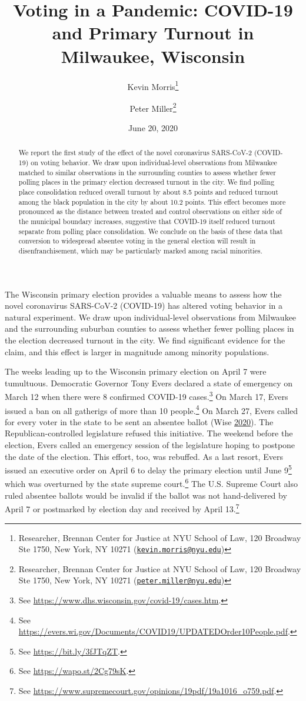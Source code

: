 \documentclass[
  12pt,
]{article}
\title{Voting in a Pandemic: COVID-19 and Primary Turnout in Milwaukee, Wisconsin}
\author{Kevin Morris\footnote{Researcher, Brennan Center for Justice at NYU School of Law, 120 Broadway Ste 1750, New York, NY 10271 (\href{mailto:kevin.morris@nyu.edu}{\nolinkurl{kevin.morris@nyu.edu}})} \and Peter Miller\footnote{Researcher, Brennan Center for Justice at NYU School of Law, 120 Broadway Ste 1750, New York, NY 10271 (\href{mailto:peter.miller@nyu.edu}{\nolinkurl{peter.miller@nyu.edu}})}}
\date{June 20, 2020}
\begin{document}
\maketitle
\begin{abstract}
We report the first study of the effect of the novel coronavirus SARS-CoV-2 (COVID-19) on voting behavior. We draw upon individual-level observations from Milwaukee matched to similar observations in the surrounding counties to assess whether fewer polling places in the primary election decreased turnout in the city. We find polling place consolidation reduced overall turnout by about 8.5 points and reduced turnout among the black population in the city by about 10.2 points. This effect becomes more pronounced as the distance between treated and control observations on either side of the municipal boundary increases, suggestive that COVID-19 itself reduced turnout separate from polling place consolidation. We conclude on the basis of these data that conversion to widespread absentee voting in the general election will result in disenfranchisement, which may be particularly marked among racial minorities.
\end{abstract}

\pagebreak

\doublespacing

The Wisconsin primary election provides a valuable means to assess how the novel coronavirus SARS-CoV-2 (COVID-19) has altered voting behavior in a natural experiment. We draw upon individual-level observations from Milwaukee and the surrounding suburban counties to assess whether fewer polling places in the election decreased turnout in the city. We find significant evidence for the claim, and this effect is larger in magnitude among minority populations.

The weeks leading up to the Wisconsin primary election on April 7 were tumultuous. Democratic Governor Tony Evers declared a state of emergency on March 12 when there were 8 confirmed COVID-19 cases.\footnote{See \url{https://www.dhs.wisconsin.gov/covid-19/cases.htm}.} On March 17, Evers issued a ban on all gatherigs of more than 10 people.\footnote{See \url{https://evers.wi.gov/Documents/COVID19/UPDATEDOrder10People.pdf}.} On March 27, Evers called for every voter in the state to be sent an absentee ballot (Wise \protect\hyperlink{ref-Wise2020}{2020}). The Republican-controlled legislature refused this initiative. The weekend before the election, Evers called an emergency session of the legislature hoping to postpone the date of the election. This effort, too, was rebuffed. As a last resort, Evers issued an executive order on April 6 to delay the primary election until June 9\footnote{See \url{https://bit.ly/3fJTqZT}.} which was overturned by the state supreme court.\footnote{See \url{https://wapo.st/2Cg79sK}.} The U.S. Supreme Court also ruled absentee ballots would be invalid if the ballot was not hand-delivered by April 7 or postmarked by election day and received by April 13.\footnote{See \url{https://www.supremecourt.gov/opinions/19pdf/19a1016_o759.pdf}.}
\end{document}
